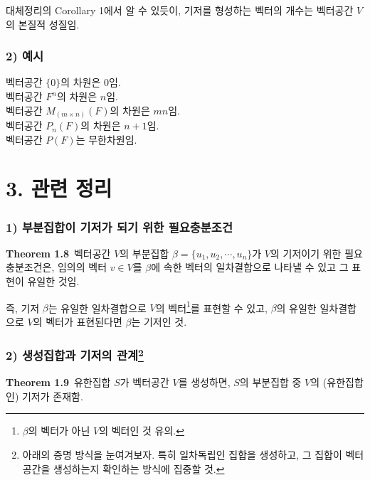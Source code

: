 대체정리의 Corollary 1에서 알 수 있듯이, 기저를 형성하는 벡터의 개수는 벡터공간 $V$의 본질적 성질임.

\subsubsection*{2) 예시}
벡터공간 $\{0\}$의 차원은 0임.\\
벡터공간 $F^n$의 차원은 $n$임.\\
벡터공간 $M_(m \times n)(F)$의 차원은 $mn$임.\\
벡터공간 $P_n(F)$의 차원은 $n+1$임.\\
벡터공간 $P(F)$는 무한차원임.


\section*{3. 관련 정리}
\subsubsection*{1) 부분집합이 기저가 되기 위한 필요충분조건}
\textbf{Theorem 1.8}\, 벡터공간 $V$의 부분집합 $\beta = \{u_1,u_2, \cdots ,u_n\}$가 $V$의 기저이기 위한 필요충분조건은, 임의의 벡터 $v \in V$를 $\beta$에 속한 벡터의 일차결합으로 나타낼 수 있고 그 표현이 유일한 것임.

즉, 기저 $\beta$는 유일한 일차결합으로 $V$의 벡터\footnote{$\beta$의 벡터가 아닌 $V$의 벡터인 것 유의.}를 표현할 수 있고, $\beta$의 유일한 일차결합으로 $V$의 벡터가 표현된다면 $\beta$는 기저인 것.


\newpage


\subsubsection*{2) 생성집합과 기저의 관계\footnote{아래의 증명 방식을 눈여겨보자. 특히 일차독립인 집합을 생성하고, 그 집합이 벡터공간을 생성하는지 확인하는 방식에 집중할 것.}}
\textbf{Theorem 1.9}\, 유한집합 $S$가 벡터공간 $V$를 생성하면, $S$의 부분집합 중 $V$의 (유한집합인) 기저가 존재함.

